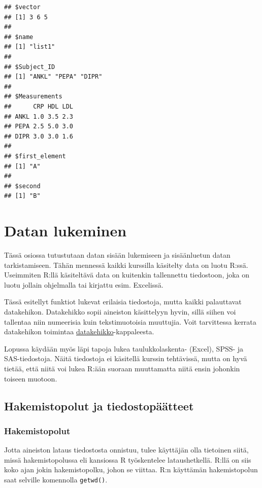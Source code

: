 \documentclass[
]{book}
\begin{document}
\begin{verbatim}
## $vector
## [1] 3 6 5
## 
## $name
## [1] "list1"
## 
## $Subject_ID
## [1] "ANKL" "PEPA" "DIPR"
## 
## $Measurements
##      CRP HDL LDL
## ANKL 1.0 3.5 2.3
## PEPA 2.5 5.0 3.0
## DIPR 3.0 3.0 1.6
## 
## $first_element
## [1] "A"
## 
## $second
## [1] "B"
\end{verbatim}

\hypertarget{reading_data}{%
\chapter{Datan lukeminen}\label{reading_data}}

Tässä osiossa tutustutaan datan sisään lukemiseen ja sisäänluetun datan tarkistamiseen. Tähän mennessä kaikki kurssilla käsitelty data on luotu R:ssä. Useimmiten R:llä käsiteltävä data on kuitenkin tallennettu tiedostoon, joka on luotu jollain ohjelmalla tai kirjattu esim. Excelissä.

Tässä esitellyt funktiot lukevat erilaisia tiedostoja, mutta kaikki palauttavat datakehikon. Datakehikko sopii aineiston käsittelyyn hyvin, sillä siihen voi tallentaa niin numeerisia kuin tekstimuotoisia muuttujia. Voit tarvittessa kerrata datakehikon toimintaa \protect\hyperlink{data-frame}{datakehikko}-kappaleesta.

Lopussa käydään myös läpi tapoja lukea taulukkolaskenta- (Excel), SPSS- ja SAS-tiedostoja. Näitä tiedostoja ei käsitellä kurssin tehtävissä, mutta on hyvä tietää, että niitä voi lukea R:ään suoraan muuttamatta niitä ensin johonkin toiseen muotoon.

\hypertarget{hakemistopolut-ja-tiedostopuxe4uxe4tteet}{%
\section{Hakemistopolut ja tiedostopäätteet}\label{hakemistopolut-ja-tiedostopuxe4uxe4tteet}}

\hypertarget{hakemistopolut}{%
\subsection{Hakemistopolut}\label{hakemistopolut}}

Jotta aineiston lataus tiedostosta onnistuu, tulee käyttäjän olla tietoinen siitä, missä hakemistopolussa eli kansiossa R työskentelee lataushetkellä. R:llä on siis koko ajan jokin hakemistopolku, johon se viittaa. R:n käyttämän hakemistopolun saat selville komennolla \texttt{getwd()}.
\end{document}
